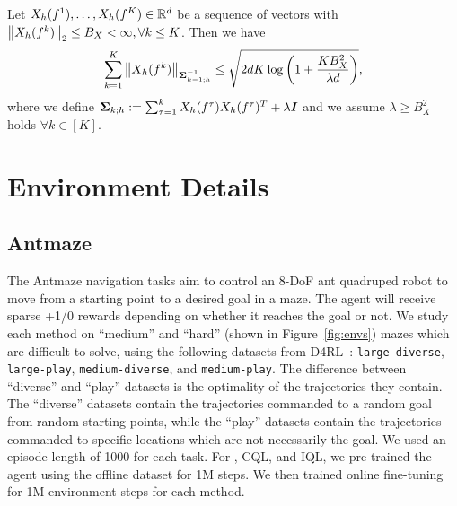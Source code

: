\begin{lemma}
    \label{lemma:bound-inverse-cov-norm}
    Let $X_h(f^1),\dots,X_h(f^K)\in \mathbb R^d$ be a sequence of vectors with $\left\| X_h(f^k) \right\|_{2}\leq B_X<\infty,\forall k\leq K$. Then we have
    \begin{equation}
        \sum_{k=1}^K\left\| X_h(f^k) \right\|_{\boldsymbol \Sigma^{-1}_{k-1;h}}\leq\sqrt{2dK\log\left( 1+\frac{KB_X^2}{\lambda d} \right)},
    \end{equation}
    where we define $\boldsymbol \Sigma_{k;h}:=\sum_{\tau=1}^kX_h(f^\tau)X_h(f^\tau)^T+\lambda \boldsymbol I$ and we assume $\lambda\geq B_X^2$ holds $\forall k\in[K]$.
\end{lemma}

\fi


\section{Environment Details}
\label{appendix:env_details}
\subsection{Antmaze} 
The Antmaze navigation tasks aim to control an 8-DoF ant quadruped robot to move from a starting point to a desired goal in a maze. The agent will receive sparse +1/0 rewards depending on whether it reaches the goal or not. We study each method on ``medium'' and ``hard'' (shown in Figure~\ref{fig:envs}) mazes which are difficult to solve, using the following datasets from D4RL~\citep{fu2020d4rl}: \texttt{large-diverse}, \texttt{large-play}, \texttt{medium-diverse}, and \texttt{medium-play}. The difference between ``diverse'' and ``play'' datasets is the optimality of the trajectories they contain. The ``diverse'' datasets contain the trajectories commanded to a random goal from random starting points, while the ``play'' datasets contain the trajectories commanded to specific locations which are not necessarily the goal. We used an episode length of 1000 for each task. For \methodname, CQL, and IQL, we pre-trained the agent using the offline dataset for 1M steps. We then trained online fine-tuning for 1M environment steps for each method.


